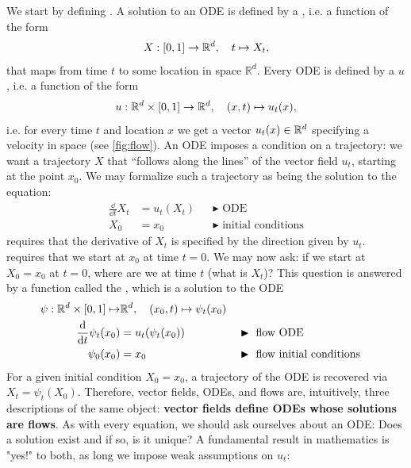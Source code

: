 We start by defining . A solution to an ODE is defined by a , i.e. a function of the form
\begin{align*}
X: [0,1] \to \mathbb{R}^d, \quad t \mapsto X_t,
\end{align*}
that maps from time $t$ to some location in space $\mathbb{R}^d$. Every ODE is defined by a  $u$, i.e. a function of the form
\begin{align*}
u:\mathbb{R}^d\times [0,1]\to \mathbb{R}^d,\quad (x,t)\mapsto u_t(x),
\end{align*}
i.e. for every time $t$ and location $x$ we get a vector $u_t(x)\in\mathbb{R}^d$ specifying a velocity in space (see  \cref{fig:flow}). An ODE imposes a condition on a trajectory: we want a trajectory $X$ that ``follows along the lines'' of the vector field $u_t$, starting at the point $x_0$. We may formalize such a trajectory as being the solution to the equation:
\begin{subequations}
    \begin{align} 
      \frac{\dd}{\dd t}X_{t} &= u_t(X_t) &&\blacktriangleright\,\,\text{ODE}\label{e:ode_ode}\\
      X_0&= x_0            &&\blacktriangleright\,\,\text{initial conditions}\label{e:ODE_boundary} 
    \end{align}
\end{subequations}
 requires that the derivative of $X_t$ is specified by the direction given by $u_t$.  requires that we start at $x_0$ at time $t=0$. We may now ask: if we start at $X_0 = x_0$ at $t=0$, where are we at time $t$ (what is $X_t$)? This question is answered by a function called the , which is a solution to the ODE
\begin{subequations}\label{e:flow}
    \begin{align}
    \psi:\mathbb{R}^d\times [0,1]\mapsto& \mathbb{R}^d,\quad (x_0,t)\mapsto \psi_t(x_0)\\
      \frac{\mathrm{d}}{\mathrm{d} t}\psi_{t}(x_0) &= u_t(\psi_{t}(x_0)) &&\blacktriangleright\,\, \text{flow ODE}\label{e:flow_flow}\\
      \psi_{0}(x_0)             &= x_0                &&\blacktriangleright\,\,\text{flow initial conditions}\label{e:flow_boundary} 
    \end{align}
\end{subequations}
For a given initial condition $X_0=x_0$, a trajectory of the ODE is recovered via $X_t = \psi_t(X_0)$. Therefore, vector fields, ODEs, and flows are, intuitively, three descriptions of the same object: \textbf{vector fields define ODEs whose solutions are flows}. As with every equation, we should ask ourselves about an ODE: Does a solution exist and if so, is it unique? A fundamental result in mathematics is "yes!" to both, as long we impose weak assumptions on $u_t$:

